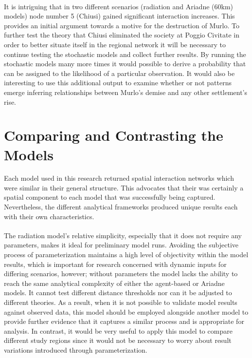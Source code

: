 \documentclass[12pt,a4paper]{thesis}
\begin{document}
\paragraph{}
It is intriguing that in two different scenarios (radiation and Ariadne (60km) models) node number 5 (Chiusi) gained significant interaction increases. This provides an initial argument towards a motive for the destruction of Murlo. To further test the theory that Chiusi eliminated the society at Poggio Civitate in order to better situate itself in the regional network it will be necessary to continue testing the stochastic models and collect further results. By running the stochastic models many more times it would possible to derive a probability that can be assigned to the likelihood of a particular observation. It would also be interesting to use this additional output to examine whether or not patterns emerge inferring relationships between Murlo's demise and any other settlement's rise.

\section{Comparing and Contrasting the Models}
\paragraph{}
Each model used in this research returned spatial interaction networks which were similar in their general structure. This advocates that their was certainly a spatial component to each model that was successfully being captured. Nevertheless, the different analytical frameworks produced unique results each with their own characteristics.

\paragraph{}
The radiation model's relative simplicity, especially that it does not require any parameters, makes it ideal for preliminary model runs. Avoiding the subjective process of parameterization maintains a high level of objectivity within the model results, which is important for research concerned with dynamic inputs for differing scenarios, however; without parameters the model lacks the ability to reach the same analytical complexity of either the agent-based or Ariadne models. It cannot test different distance thresholds nor can it be adjusted to different theories. As a result, when it is not possible to validate model results against observed data, this model should be employed alongside another model to provide further evidence that it captures a similar process and is appropriate for analysis. In contrast, it would be very useful to apply this model to compare different study regions since it would not be necessary to worry about result variations introduced through parameterization. 
\end{document}
